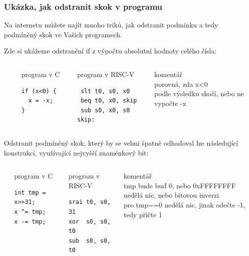 \documentclass{beamer}
\begin{document}
\begin{frame}[fragile]
\frametitle{Ukázka, jak odstranit skok v programu}

Na internetu můžete najít mnoho triků, jak odstranit podmínku a tedy podmíněný skok ve Vašich programech.

Zde si ukážeme odstranění if z výpočtu absolutní hodnoty celého čísla:

\begin{columns}[T]
\begin{column}{0.01\textwidth}
\phantom{x}
\end{column}
\begin{column}{0.25\textwidth}
program v C
\begin{verbatim}
if (x<0) {
  x = -x;
}
\end{verbatim}
\end{column}

\begin{column}{0.28\textwidth}
program v RISC-V
\begin{verbatim}
 slt t0, s0, x0
 beq t0, x0, skip
 sub s0, x0, s0
skip:
\end{verbatim}
\end{column}
\begin{column}{0.45\textwidth}
\phantom{x}komentář\\
\small
porovná, zda x<0\\
podle výsledku skočí, nebo ne\\
vypočte -x
\end{column}
\end{columns}
\bigskip

Odstranit podmíněný skok, který by se velmi špatně odhadoval lze následující konstrukcí, využívající nejvyšší znaménkový bit:
\begin{columns}[T]
\begin{column}{0.01\textwidth}
\phantom{x}
\end{column}
\begin{column}{0.25\textwidth}
program v C
\begin{verbatim}
int tmp = x>>31;
x ^= tmp;
x -= tmp;
\end{verbatim}
\end{column}

\begin{column}{0.28\textwidth}
program v RISC-V
\begin{verbatim}
srai t0, s0, 31
xor  s0, s0, t0
sub  s0, s0, t0
\end{verbatim}
\end{column}
\begin{column}{0.45\textwidth}
\phantom{x}komentář\\
\small
tmp bude buď 0, nebo 0xFFFFFFFF\\
nedělá nic, nebo bitovou inverzi\\
pro tmp==0 nedělá nic, jinak odečte -1, tedy přičte 1
\end{column}
\end{columns}
\end{frame}
\end{document}
